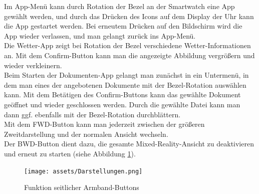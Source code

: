 \documentclass[11pt, a4paper]{article}
\begin{document}
Im App-Menü kann durch Rotation der Bezel an der Smartwatch eine App gewählt werden, und durch das Drücken des Icons auf dem Display der Uhr kann die App gestartet werden. Bei erneutem Drücken auf den Bildschirm wird die App wieder verlassen, und man gelangt zurück ins App-Menü.\\
Die Wetter-App zeigt bei Rotation der Bezel verschiedene Wetter-Informationen an. Mit dem Confirm-Button kann man die angezeigte Abbildung vergrößern und wieder verkleinern.\\
Beim Starten der Dokumenten-App gelangt man zunächst in ein Untermenü, in dem man eines der angebotenen Dokumente mit der Bezel-Rotation auswählen kann. Mit dem Betätigen des Confirm-Buttons kann das gewählte Dokument geöffnet und wieder geschlossen werden. Durch die gewählte Datei kann man dann ggf. ebenfalls mit der Bezel-Rotation durchblättern.\\
Mit dem FWD-Button kann man jederzeit zwischen der größeren Zweitdarstellung und der normalen Ansicht wechseln. \\
Der BWD-Button dient dazu, die gesamte Mixed-Reality-Ansicht zu deaktivieren und erneut zu starten (siehe Abbildung \ref{fig:button_behavior}).

\begin{figure}[h]
	\centering
	\texttt{[image: assets/Darstellungen.png]}
	\caption{Funktion seitlicher Armband-Buttons}
	\label{fig:button_behavior}
\end{figure}

\newpage

\listoffigures
\end{document}
